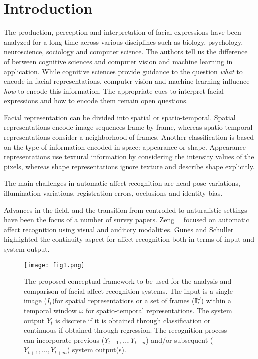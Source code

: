 \documentclass[10pt,twocolumn,letterpaper]{article}
\begin{document}
	\section*{Introduction}
	The production, perception and interpretation of facial expressions have been analyzed for a long time across various disciplines such as biology, psychology, neuroscience, sociology and computer science. The authors tell us the difference of between cognitive sciences and computer vision and machine learning in application. While cognitive sciences provide guidance to the question \emph{what} to encode in facial representations, computer vision and machine learning influence \emph{how} to encode this information. The appropriate cues to interpret facial expressions and how to encode them remain open questions.
	\par
	Facial representation can be divided into spatial or spatio-temporal. Spatial representations encode image sequences frame-by-frame, whereas spatio-temporal representations consider a neighborhood of frames. Another classification is based on the type of information encoded in space: appearance or shape. Appearance representations use textural information by considering the intensity values of the pixels, whereas shape representations ignore texture and describe shape explicitly.
	\par
	The main challenges in automatic affect recognition are head-pose variations, illumination variations, registration errors, occlusions and identity bias.
	\par
	Advances in the field, and the transition from controlled to naturalistic settings have been the focus of a number of survey papers. Zeng~\etal~\cite{Zeng2009A} focused on automatic affect recognition using visual and auditory modalities. Gunes and Schuller~\cite{Gunes2013Categorical} highlighted the continuity aspect for affect recognition both in terms of input and system output.
	\begin{figure}[t]
		\centering
		\texttt{[image: fig1.png]}
		\caption{The proposed conceptual framework to be used for the analysis and comparison of facial affect recognition systems. The input is a single image ($I_t$)for spatial representations or a set of frames ($\textbf{I}^{\omega}_{t}$) within a temporal window $\omega$ for spatio-temporal representations. The system output $Y_t$ is discrete if it is obtained through classification or continuous if obtained through regression. The recognition process can incorporate previous ({$Y_{t-1},\dots,Y_{t-n}$}) and/or subsequent ({$Y_{t+1},\dots,Y_{t+m}$}) system output(s).} \label{fig1}
	\end{figure}
\end{document}
